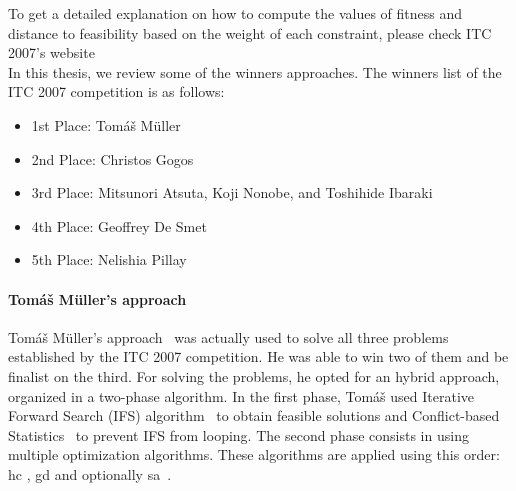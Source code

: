 To get a detailed explanation on how to compute the values of fitness and distance to feasibility based on the weight of each constraint, please check ITC 2007's website~\cite{McCollum2008}\\


In this thesis, we review some of the winners approaches. The winners list of the ITC 2007 competition is as follows:
\begin{itemize}
	\item 1st Place: Tom\'{a}\v{s} M\"{u}ller
	\item 2nd Place: Christos Gogos
	\item 3rd Place: Mitsunori Atsuta, Koji Nonobe, and Toshihide Ibaraki
	\item 4th Place: Geoffrey De Smet
	\item 5th Place: Nelishia Pillay
\end{itemize}

\paragraph{Tom\'{a}\v{s} M\"{u}ller's approach}

Tom\'{a}\v{s} M\"{u}ller's approach~\cite{Mueller2009} was actually used to solve all three problems established by the ITC 2007 competition. He was able to win two of them and be finalist on the third. For solving the problems, he opted for an hybrid approach, organized in a two-phase algorithm. In the first phase, Tom\'{a}\v{s} used Iterative Forward Search (IFS) algorithm~\cite{Mueller2005} to obtain feasible solutions and Conflict-based Statistics~\cite{Mueller2004} to prevent IFS from looping. 
The second phase consists in using multiple optimization algorithms. These algorithms are applied using this order: \gls{hc} \cite{Russell2010}, \gls{gd} \cite{Dueck1993} and optionally \gls{sa}~\cite{Kirkpatrick1983}.\\

